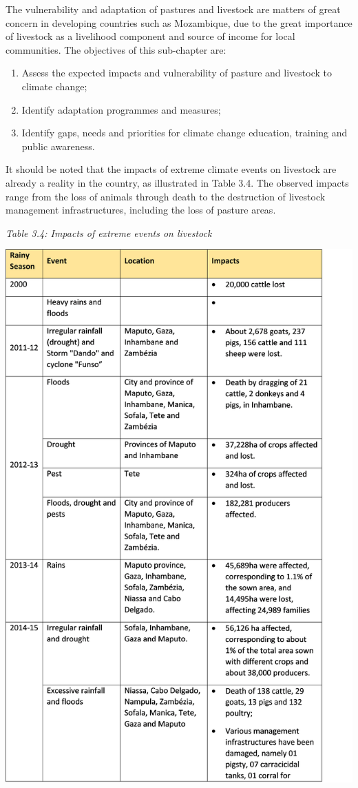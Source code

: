 \documentclass[
]{book}
\begin{document}
The vulnerability and adaptation of pastures and livestock are matters of great concern in developing countries such as Mozambique, due to the great importance of livestock as a livelihood component and source of income for local communities. The objectives of this sub-chapter are:

\begin{enumerate}
\def\labelenumi{(\arabic{enumi})}
\item
  Assess the expected impacts and vulnerability of pasture and livestock to climate change;
\item
  Identify adaptation programmes and measures;
\item
  Identify gaps, needs and priorities for climate change education, training and public awareness.
\end{enumerate}

It should be noted that the impacts of extreme climate events on livestock are already a reality in the country, as illustrated in Table 3.4. The observed impacts range from the loss of animals through death to the destruction of livestock management infrastructures, including the loss of pasture areas.

\emph{Table 3.4: Impacts of extreme events on livestock}

\includegraphics{Figure29.png}
\end{document}
